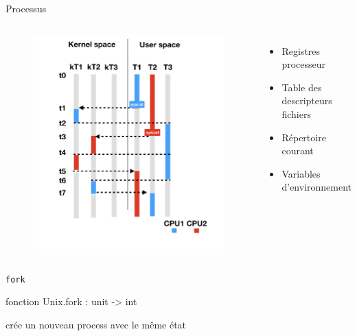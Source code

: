 \begin{frame}{Processus}

\begin{columns}
\begin{figure}
    \centering
    \includegraphics[width=\textwidth]{slides/images/scheduling.jpg}
\end{figure}



 \begin{itemize}[label=$-$]
     \item Registres processeur
     \item Table des descripteurs fichiers
     \item Répertoire courant
     \item Variables d'environnement
 \end{itemize}
\end{columns}

\end{frame}

\begin{frame}{\texttt{fork}}

    fonction Unix.fork : unit -> int

    crée un nouveau process avec le même état
\end{frame}

